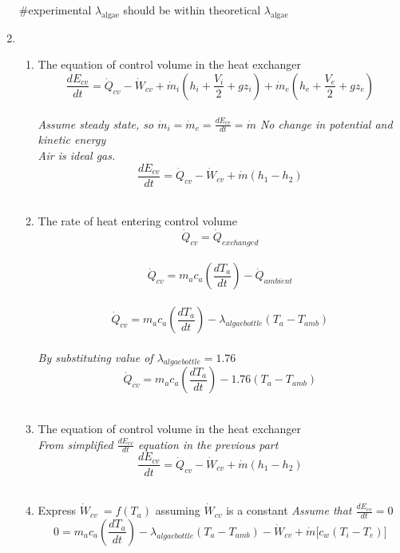 \documentclass[12pt,a4paper]{article}
\begin{document}
\begin{enumerate}[label=\Alph*]
    	\#experimental \(\lambda_{\text{algae}}\) should be within theoretical
    	\(\lambda_{\text{algae}}\)
    	\item
    	\begin{enumerate}
    		\def\labelenumi{\roman{enumi}.}
    		\item The equation of control volume in the heat exchanger
    		$$\frac{dE_{cv}}{dt} = \dot{Q}_{cv} - \dot{W}_{cv} + \dot{m}_{i} \left( h_i + \frac{V_i}{2} + gz_i \right) + \dot{m}_{e} \left( h_e + \frac{V_e}{2} + gz_e \right)$$ \\
    		\textit{Assume steady state, so $\dot{m}_{i} = \dot{m}_{e} = \frac{dE_{cv}}{dt} = \dot{m}$ No change in potential and kinetic energy} \\
    		\textit{Air is ideal gas.} \\
    		$$\frac{dE_{cv}}{dt} = \dot{Q}_{cv} - \dot{W}_{cv} + \dot{m} \left( h_1 - h_2 \right)$$ \\
    		\item The rate of heat entering control volume \\
    		$$\dot{Q}_{cv} = \dot{Q}_{exchanged}$$ \\
    		$$\dot{Q}_{cv} = m_a c_a \left( \frac{dT_a}{dt} \right) - \dot{Q}_{ambient}$$ \\
    		$$\dot{Q}_{cv} = m_a c_a \left( \frac{dT_a}{dt} \right) - \lambda_{algaebottle} \left( T_a - T_{amb} \right)$$ \\
    		\textit{By substituting value of $\lambda_{algaebottle} = 1.76$} \\
    		$$\dot{Q}_{cv} = m_a c_a \left( \frac{dT_a}{dt} \right) - 1.76 \left( T_a - T_{amb} \right)$$ \\
    		\item The equation of control volume in the heat exchanger \\
    		\textit{From simplified $\frac{dE_{cv}}{dt}$ equation in the previous part} \\
    		$$\frac{dE_{cv}}{dt} = \dot{Q}_{cv} - \dot{W}_{cv} + \dot{m} \left( h_1 - h_2 \right)$$ \\
    		\item Express $\dot{W}_{cv}\ = f \left( T_a \right)$ assuming $\dot{W}_{cv}$ is a constant
    		\textit{Assume that $\frac{dE_{cv}}{dt} = 0$} \\
    		$$0 = m_a c_a \left( \frac{dT_a}{dt} \right) - \lambda_{algaebottle} \left( T_a - T_{amb} \right) - \dot{W}_{cv} + \dot{m} \lbrack c_w \left( T_i - T_e \right) \rbrack$$ \\

\end{enumerate}
\end{enumerate}
\end{document}
